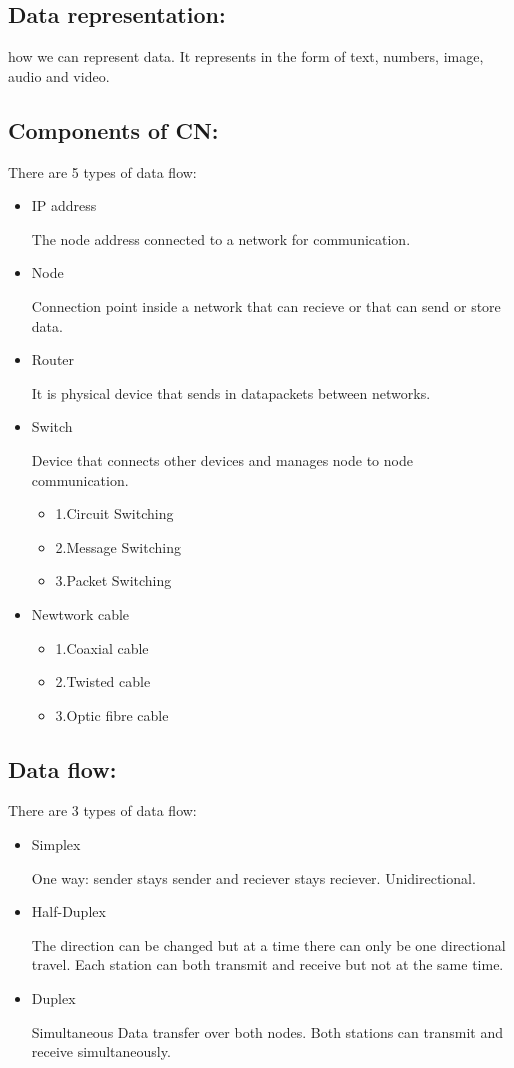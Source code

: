 \documentclass[11pt,letterpaper]{article}
\begin{document}
\subsection{Data representation:}
how we can represent data. It represents in the form of text, numbers, image, audio and video.

\subsection{Components of CN:}
There are 5 types of data flow: 
\begin{itemize}
\item IP address
  
  The node address connected to a network for communication.
\item Node 
	
  Connection point inside a network that can recieve or that can send or store data. 
\item Router
  
  It is physical device that sends in datapackets between networks.
\item Switch
  
  Device that connects other devices and manages node to node communication.
  \begin{itemize}
  \item 1.Circuit Switching 
  \item 2.Message Switching
  \item 3.Packet Switching
  \end{itemize}
\item Newtwork cable
  \begin{itemize}
  \item 1.Coaxial cable
  \item 2.Twisted cable
  \item 3.Optic fibre cable
  \end{itemize} 
\end{itemize}

\subsection{Data flow:}
There are 3 types of data flow: 
\begin{itemize}
\item Simplex
 	
  One way: sender stays sender and reciever stays reciever. 
	Unidirectional. 
\item Half-Duplex
	
  The direction can be changed but at a time there can only be one directional travel.
	Each station can both transmit and receive but not at the  same time. 
\item Duplex
	
  Simultaneous Data transfer over both nodes. 
	Both stations can transmit and receive simultaneously. 
\end{itemize}
\end{document}
